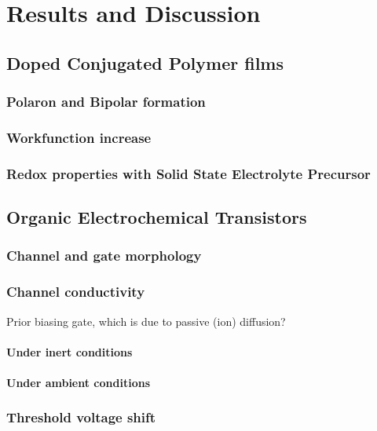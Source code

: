 \chapter{Results and Discussion}
\label{cha:3}

\section{Doped Conjugated Polymer films}
\subsection{Polaron and Bipolar formation}

\subsection{Workfunction increase}

\subsection{Redox properties with Solid State Electrolyte Precursor}


\section{Organic Electrochemical Transistors}
\subsection{Channel and gate morphology}

\subsection{Channel conductivity}

Prior biasing gate, which is due to passive (ion) diffusion?

\subsubsection{Under inert conditions}

\subsubsection{Under ambient conditions}

\subsection{Threshold voltage shift}

